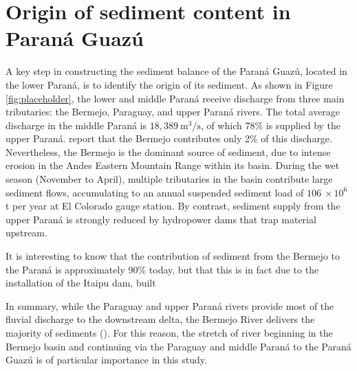 \section{Origin of sediment content in Paraná Guazú}

A key step in constructing the sediment balance of the Paraná Guazú, located in the lower Paraná, is to identify the origin of its sediment. As shown in Figure \ref{fig:placeholder}, the lower and middle Paraná receive discharge from three main tributaries: the Bermejo, Paraguay, and upper Paraná rivers. The total average discharge in the middle Paraná is $18,389~\mathrm{m^3/s}$, of which 78\% is supplied by the upper Paraná. \citeauthor{lopezweibelSourcesTemporalDynamics2022} report that the Bermejo contributes only 2\% of this discharge. Nevertheless, the Bermejo is the dominant source of sediment, due to intense erosion in the Andes Eastern Mountain Range within its basin. During the wet season (November to April), multiple tributaries in the basin contribute large sediment flows, accumulating to an annual suspended sediment load of $106 ~\times 10^6$ t per year at El Colorado gauge station. By contrast, sediment supply from the upper Paraná is strongly reduced by hydropower dams that trap material upstream. 

It is interesting to know that the contribution of sediment from the Bermejo to the Paraná is approximately 90\% today, but that this is in fact due to the installation of the Itaipu dam, built 

In summary, while the Paraguay and upper Paraná rivers provide most of the fluvial discharge to the downstream delta, the Bermejo River delivers the majority of sediments (\cite{lopezweibelSourcesTemporalDynamics2022}). For this reason, the stretch of river beginning in the Bermejo basin and continuing via the Paraguay and middle Paraná to the Paraná Guazú is of particular importance in this study.  












